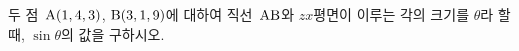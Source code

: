 두 점~$\mathrm{A}(1{,}\mkern3mu\mathopen{}4{,}\mkern3mu\mathopen{}3)$, $\mathrm{B}(3{,}\mkern3mu\mathopen{}1{,}\mkern3mu\mathopen{}9)$에 대하여 직선~$\mathrm{AB}$와 $zx$평면이 이루는 각의 크기를 $\theta$라 할 때, $\sin\theta$의 값을 구하시오.
